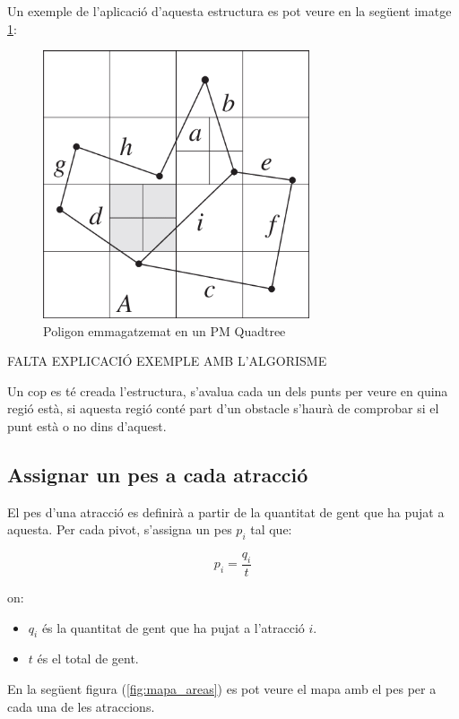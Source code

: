 \documentclass[12pt]{article}
\begin{document}
Un exemple de l'aplicació d'aquesta estructura es pot veure en la següent imatge \ref{fig:poligon_pm_quadtree}:

\begin{figure}[H]
	\centering
	\includegraphics[width=0.7\textwidth]{imatges/pm_quadtree.png}\par\vspace{1cm}
	\caption{Poligon emmagatzemat en un PM Quadtree}
	\label{fig:poligon_pm_quadtree}
\end{figure}

FALTA EXPLICACIÓ EXEMPLE AMB L'ALGORISME

Un cop es té creada l'estructura, s'avalua cada un dels punts per veure en quina regió està, si aquesta regió conté part d'un obstacle s'haurà de comprobar si el punt està o no dins d'aquest. 

\subsection{Assignar un pes a cada atracció}
El pes d'una atracció es definirà a partir de la quantitat de gent que ha pujat a aquesta. Per cada pivot, s'assigna un pes $p_{i}$ tal que:
 
$$p_{i} = \frac{q_{i}}{t}$$

on:
\begin{itemize}
	\item $q_{i}$ és la quantitat de gent que ha pujat a l'atracció $i$.
	\item $t$ és el total de gent.
\end{itemize}

En la següent figura (\ref{fig:mapa_areas}) es pot veure el mapa amb el pes per a cada una de les atraccions.
\end{document}
